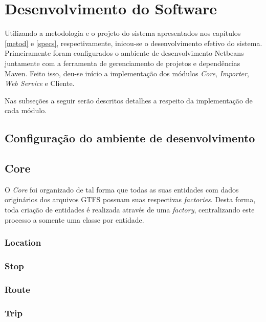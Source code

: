 \chapter{Desenvolvimento do Software}
\label{chap:desenv}

Utilizando a metodologia e o projeto do sistema apresentados nos capítulos \ref{metod} e \ref{specs}, respectivamente, inicou-se o desenvolvimento efetivo do sistema.
Primeiramente foram configurados o ambiente de desenvolvimento Netbeans juntamente com a ferramenta de gerenciamento de projetos e dependências Maven.
Feito isso, deu-se início a implementação dos módulos \emph{Core}, \emph{Importer}, \emph{Web Service} e Cliente.


Nas subseções a seguir serão descritos detalhes a respeito da implementação de cada módulo.

\section{Configuração do ambiente de desenvolvimento}

\section{Core}
O \emph{Core} foi organizado de tal forma que todas as suas entidades com dados originários dos arquivos GTFS possuam suas respectivas \emph{factories}.
Desta forma, toda criação de entidades é realizada através de uma \emph{factory}, centralizando este processo a somente uma classe por entidade.

\subsection{Location}

\subsection{Stop}

\subsection{Route}

\subsection{Trip}

